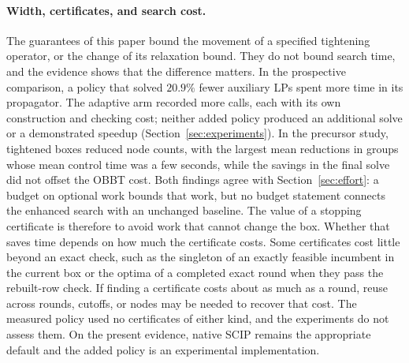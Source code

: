 \paragraph{Width, certificates, and search cost.} The guarantees of this
paper bound the movement of a specified tightening operator, or the change
of its relaxation bound. They do not bound search time, and the evidence
shows that the difference matters. In the prospective comparison, a policy
that solved $20.9\%$ fewer auxiliary LPs spent more time in its propagator.
The adaptive arm recorded more calls, each with its own construction and
checking cost; neither added policy produced an additional solve or a
demonstrated speedup (Section~\ref{sec:experiments}). In the precursor study,
tightened boxes reduced node counts, with the largest mean reductions in
groups whose mean control time was a few seconds, while the savings in the
final solve did not offset the OBBT cost. Both findings
agree with Section~\ref{sec:effort}: a budget on optional work bounds that
work, but no budget statement connects the enhanced search with an unchanged
baseline. The value of a stopping certificate is therefore to avoid work that
cannot change the box. Whether that saves time depends on how much the
certificate costs. Some certificates cost little beyond an exact check, such
as the singleton of an exactly feasible incumbent in the current box or the
optima of a completed exact round when they pass the rebuilt-row check. If finding a certificate costs about as
much as a round, reuse across rounds, cutoffs, or nodes may be needed to
recover that cost. The measured policy used no certificates of either
kind, and the experiments do not assess them. On the
present evidence, native SCIP remains the appropriate default and the added
policy is an experimental implementation.

